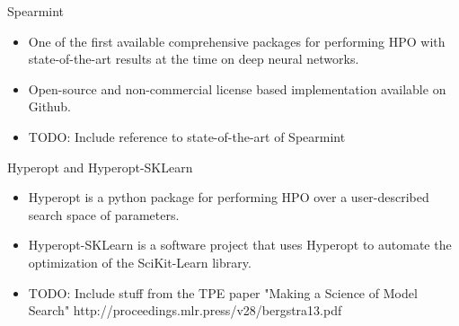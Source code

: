 \begin{frame}[c]{Spearmint}
\pause
\begin{itemize}
    \item<+-> One of the first available comprehensive packages for performing HPO with state-of-the-art results at the time on deep neural networks.
    
    \item<+-> Open-source and non-commercial license based implementation available on Github.
    
    \item<+-> TODO: Include reference to state-of-the-art of Spearmint
\end{itemize}

\begin{center}
    
\end{center}
\end{frame}


\begin{frame}[c]{Hyperopt and Hyperopt-SKLearn}
\pause
\begin{itemize}
    \item<+-> Hyperopt is a python package for performing HPO over a user-described search space of parameters.
    \item<+-> Hyperopt-SKLearn is a software project that uses Hyperopt to automate the optimization of the SciKit-Learn library.
    \item<+-> TODO: Include stuff from the TPE paper "Making a Science of Model Search" http://proceedings.mlr.press/v28/bergstra13.pdf
\end{itemize}

\begin{center}
    
\end{center}
\end{frame}

